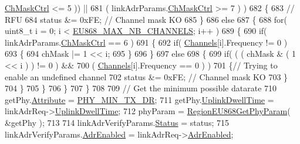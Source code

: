\begin{DoxyCode}
      \mbox{\hyperlink{structs_region_common_link_adr_params_ac5e1891f30a172b2ce39bc3498e1843d}{ChMaskCtrl}} <= 5 )) ||
681                 ( linkAdrParams.\mbox{\hyperlink{structs_region_common_link_adr_params_ac5e1891f30a172b2ce39bc3498e1843d}{ChMaskCtrl}} >= 7 ) )
682         \{
683             \textcolor{comment}{// RFU}
684             status &= 0xFE; \textcolor{comment}{// Channel mask KO}
685         \}
686         \textcolor{keywordflow}{else}
687         \{
688             \textcolor{keywordflow}{for}( uint8\_t i = 0; i < \mbox{\hyperlink{group___r_e_g_i_o_n_e_u868_gaf94c3090ac541fec3c97b2146702d252}{EU868\_MAX\_NB\_CHANNELS}}; i++ )
689             \{
690                 \textcolor{keywordflow}{if}( linkAdrParams.\mbox{\hyperlink{structs_region_common_link_adr_params_ac5e1891f30a172b2ce39bc3498e1843d}{ChMaskCtrl}} == 6 )
691                 \{
692                     \textcolor{keywordflow}{if}( \mbox{\hyperlink{_region_e_u868_8c_a2f381382b4cbbe721da7b980ec467229}{Channels}}[i].Frequency != 0 )
693                     \{
694                         chMask |= 1 << i;
695                     \}
696                 \}
697                 \textcolor{keywordflow}{else}
698                 \{
699                     \textcolor{keywordflow}{if}( ( ( chMask & ( 1 << i ) ) != 0 ) &&
700                         ( \mbox{\hyperlink{_region_e_u868_8c_a2f381382b4cbbe721da7b980ec467229}{Channels}}[i].Frequency == 0 ) )
701                     \{\textcolor{comment}{// Trying to enable an undefined channel}
702                         status &= 0xFE; \textcolor{comment}{// Channel mask KO}
703                     \}
704                 \}
705             \}
706         \}
707     \}
708 
709     \textcolor{comment}{// Get the minimum possible datarate}
710     getPhy.\mbox{\hyperlink{structs_get_phy_params_abdcb168ffd6913b85e2f635d7a475f2d}{Attribute}} = \mbox{\hyperlink{group___r_e_g_i_o_n_gga51cbe8f5433d914fe9cf81b451de2c2daace3e56c88b40def8ed6a9106871e7de}{PHY\_MIN\_TX\_DR}};
711     getPhy.\mbox{\hyperlink{structs_get_phy_params_a0e6663762d6f9173bc8d8cb018f8f17a}{UplinkDwellTime}} = linkAdrReq->\mbox{\hyperlink{structs_link_adr_req_params_a0e6663762d6f9173bc8d8cb018f8f17a}{UplinkDwellTime}};
712     phyParam = \mbox{\hyperlink{group___r_e_g_i_o_n_e_u868_ga4150dec3b05b9774aedf4e2e32499fd3}{RegionEU868GetPhyParam}}( &getPhy );
713 
714     linkAdrVerifyParams.\mbox{\hyperlink{structs_region_common_link_adr_req_verify_params_a7ca418fa247ab5f1df4e8b5852d8b738}{Status}} = status;
715     linkAdrVerifyParams.\mbox{\hyperlink{structs_region_common_link_adr_req_verify_params_ab3e2fb44577c95786e11aacd56769703}{AdrEnabled}} = linkAdrReq->\mbox{\hyperlink{structs_link_adr_req_params_ab3e2fb44577c95786e11aacd56769703}{AdrEnabled}};

\end{DoxyCode}
